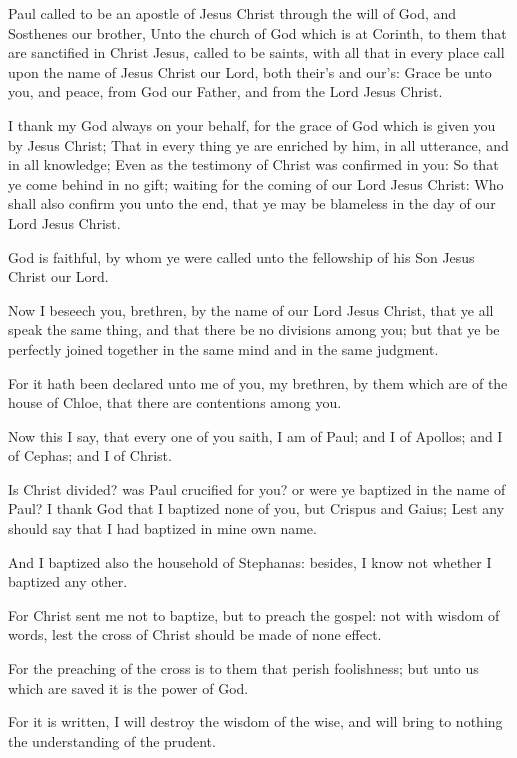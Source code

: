 \Chapter
\Verse Paul called to be an apostle of Jesus Christ through the will of God, and Sosthenes our brother, \Verse Unto the church of God which is at Corinth, to them that are sanctified in Christ Jesus, called to be saints, with all that in every place call upon the name of Jesus Christ our Lord, both their's and our's: \Verse Grace be unto you, and peace, from God our Father, and from the Lord Jesus Christ.

\Verse I thank my God always on your behalf, for the grace of God which is given you by Jesus Christ; \Verse That in every thing ye are enriched by him, in all utterance, and in all knowledge; \Verse Even as the testimony of Christ was confirmed in you: \Verse So that ye come behind in no gift; waiting for the coming of our Lord Jesus Christ: \Verse Who shall also confirm you unto the end, that ye may be blameless in the day of our Lord Jesus Christ.

\Verse God is faithful, by whom ye were called unto the fellowship of his Son Jesus Christ our Lord.

\Verse Now I beseech you, brethren, by the name of our Lord Jesus Christ, that ye all speak the same thing, and that there be no divisions among you; but that ye be perfectly joined together in the same mind and in the same judgment.

\Verse For it hath been declared unto me of you, my brethren, by them which are of the house of Chloe, that there are contentions among you.

\Verse Now this I say, that every one of you saith, I am of Paul; and I of Apollos; and I of Cephas; and I of Christ.

\Verse Is Christ divided? was Paul crucified for you? or were ye baptized in the name of Paul?  \Verse I thank God that I baptized none of you, but Crispus and Gaius; \Verse Lest any should say that I had baptized in mine own name.

\Verse And I baptized also the household of Stephanas: besides, I know not whether I baptized any other.

\Verse For Christ sent me not to baptize, but to preach the gospel: not with wisdom of words, lest the cross of Christ should be made of none effect.

\Verse For the preaching of the cross is to them that perish foolishness; but unto us which are saved it is the power of God.

\Verse For it is written, I will destroy the wisdom of the wise, and will bring to nothing the understanding of the prudent.

